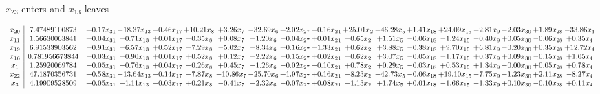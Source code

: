 \documentclass[9pt]{article}
\begin{document}
 $ x_{23} $ enters and $ x_{13} $ leaves 

 \[\begin{array}{c| c c@{\hskip 2pt} c@{\hskip 2pt} c@{\hskip 2pt} c@{\hskip 2pt} c@{\hskip 2pt} c@{\hskip 2pt} c@{\hskip 2pt} c@{\hskip 2pt} c@{\hskip 2pt} c@{\hskip 2pt} c@{\hskip 2pt} c@{\hskip 2pt} c@{\hskip 2pt} c@{\hskip 2pt} c@{\hskip 2pt} c@{\hskip 2pt} }
 x_{20}   &  7.47489100873 & +  0.17 x_{31} & -18.37 x_{13} & -0.46 x_{17} & + 10.21 x_{8} & +  3.26 x_{7} & -32.69 x_{6} & +  2.02 x_{27} & -0.16 x_{21} & + 25.01 x_{2} & -46.28 x_{5} & +  1.41 x_{18} & + 24.09 x_{15} & -2.81 x_{9} & -2.03 x_{30} & +  1.89 x_{28} & -33.86 x_{4}\\
 x_{11}   &  1.56630063841 & +  0.04 x_{31} & +  0.71 x_{13} & +  0.01 x_{17} & -0.35 x_{8} & +  0.08 x_{7} & +  1.20 x_{6} & -0.04 x_{27} & +  0.01 x_{21} & -0.65 x_{2} & +  1.51 x_{5} & -0.06 x_{18} & -1.24 x_{15} & -0.40 x_{9} & +  0.05 x_{30} & -0.06 x_{28} & +  0.35 x_{4}\\
 x_{19}   &  6.91533903562 & -0.91 x_{31} & -6.57 x_{13} & +  0.52 x_{17} & -7.29 x_{8} & -5.02 x_{7} & -8.34 x_{6} & +  0.16 x_{27} & -1.33 x_{21} & +  0.62 x_{2} & +  3.88 x_{5} & -0.38 x_{18} & +  9.70 x_{15} & +  6.81 x_{9} & -0.20 x_{30} & +  0.35 x_{28} & + 12.72 x_{4}\\
 x_{16}   &  0.781956673844 & -0.03 x_{31} & +  0.90 x_{13} & +  0.01 x_{17} & +  0.52 x_{8} & +  0.12 x_{7} & +  2.22 x_{6} & -0.15 x_{27} & +  0.02 x_{21} & -0.62 x_{2} & +  3.07 x_{5} & -0.05 x_{18} & -1.17 x_{15} & +  0.37 x_{9} & +  0.09 x_{30} & -0.15 x_{28} & +  1.05 x_{4}\\
 x_{1}   &  1.25920069784 & -0.05 x_{31} & -0.76 x_{13} & +  0.04 x_{17} & -0.26 x_{8} & +  0.45 x_{7} & -1.26 x_{6} & -0.02 x_{27} & -0.10 x_{21} & +  0.78 x_{2} & +  0.29 x_{5} & -0.03 x_{18} & +  0.53 x_{15} & +  1.34 x_{9} & -0.00 x_{30} & +  0.05 x_{28} & +  0.78 x_{4}\\
 x_{22}   &  47.1870356731 & +  0.58 x_{31} & -13.64 x_{13} & -0.14 x_{17} & -7.87 x_{8} & -10.86 x_{7} & -25.70 x_{6} & +  1.97 x_{27} & +  0.16 x_{21} & -8.23 x_{2} & -42.73 x_{5} & -0.06 x_{18} & + 19.10 x_{15} & -7.75 x_{9} & -1.23 x_{30} & +  2.11 x_{28} & -8.27 x_{4}\\
 x_{3}   &  4.19909528509 & +  0.05 x_{31} & +  1.11 x_{13} & -0.03 x_{17} & +  0.21 x_{8} & -0.41 x_{7} & +  2.32 x_{6} & -0.07 x_{27} & +  0.08 x_{21} & -1.13 x_{2} & +  1.74 x_{5} & +  0.01 x_{18} & -1.66 x_{15} & -1.33 x_{9} & +  0.10 x_{30} & -0.10 x_{28} & +  0.11 x_{4}\\

\end{array}\]
\end{document}
